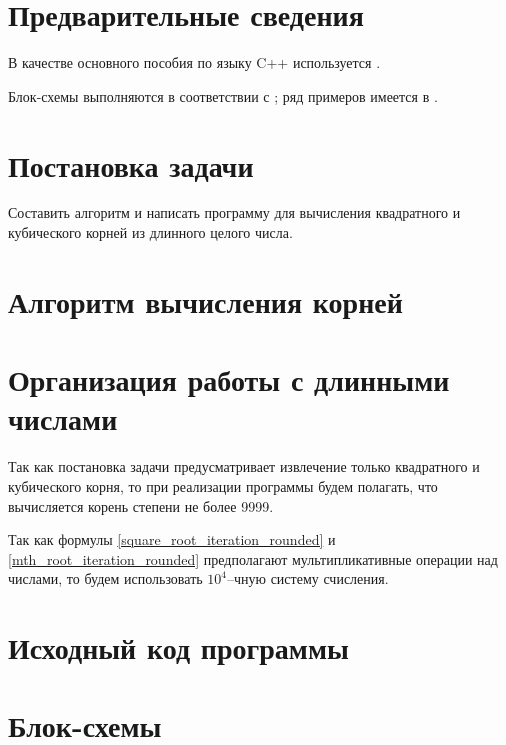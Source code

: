 \documentclass[a4paper,12pt]{article} %
\begin{document}
\setcounter{page}{2}

\section*{Предварительные сведения}

В качестве основного пособия по языку C++ используется \cite{chmyhalo}.


Блок-схемы выполняются в соответствии с \cite{gost-block-scheme};
ряд примеров имеется в \cite{wiki-block-scheme}.


\section*{Постановка задачи}
Составить алгоритм и написать программу
для вычисления квадратного и кубического корней из длинного целого числа.


\section*{Алгоритм вычисления корней}

\section*{Организация работы с длинными числами}
Так как постановка задачи предусматривает извлечение только квадратного и кубического корня,
то при реализации программы будем полагать, что вычисляется корень степени не более 9999.

Так как формулы \eqref{square_root_iteration_rounded} и \eqref{mth_root_iteration_rounded}
предполагают мультипликативные операции над числами,
то будем использовать $10^4$--чную систему счисления.

\section*{Исходный код программы}







\section*{Блок-схемы}
\end{document}
